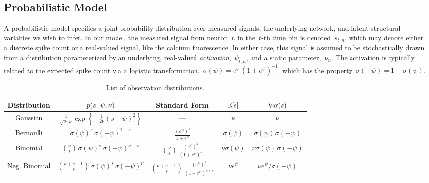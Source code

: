 \subsection{Probabilistic Model}
A probabilistic model specifies a joint probability distribution over
measured signals, the underlying network, and latent structural
variables we wish to infer.  In our model, the measured signal from
neuron~$n$ in the~$t$-th time bin is denoted~$s_{t,n}$, which may 
denote either a discrete spike count or a real-valued signal, like 
the calcium fluorescence. In either case, this signal is assumed 
to be stochastically drawn from a distribution parameterized by 
an underlying, real-valued \emph{activation},~$\psi_{t,n}$,
and a static parameter,~$\nu_n$. The
activation is typically related to the expected spike count via
a logistic transformation,~$\sigma(\psi) = e^\psi \, (1+e^\psi)^{-1}$,
which has the property~$\sigma(-\psi) = 1-\sigma(\psi)$.

\begin{table}
\begin{center}
\begin{tabular}{c|c|c|c|c}
  \textbf{Distribution} & $p(s \,|\, \psi, \nu)$ & Standard Form & $\mathbb{E}[s]$ & $\mathrm{Var}(s)$ \\
  \hline
  Gaussian & $\frac{1}{\sqrt{2 \pi \nu}}\exp \left \{ -\frac{1}{2 \nu} (s - \psi)^2 \right \}$
  & --- 
  & $\psi$ & $\nu$ \\
  Bernoulli & $\sigma(\psi)^s \, \sigma(-\psi)^{1-s}$
  & $\frac{(e^\psi)^s}{1+e^\psi}$
  & $\sigma(\psi)$ & $\sigma(\psi) \, \sigma(-\psi)$ \\
  Binomial & ${\nu \choose s} \, \sigma(\psi)^s \, \sigma(-\psi)^{\nu-s}$
  & ${\nu \choose s} \,\frac{(e^\psi)^s}{(1+e^\psi)^\nu}$
  & $\nu \sigma(\psi)$ & $\nu \sigma(\psi) \, \sigma(-\psi)$ \\
  Neg. Binomial & ${\nu + s -1 \choose s} \, \sigma(\psi)^s \, \sigma(-\psi)^{\nu}$
  & ${\nu +s - 1 \choose s} \,\frac{(e^\psi)^s}{(1+e^\psi)^{\nu+s}}$
  & $\nu e^\psi$ & $\nu e^\psi / \sigma(-\psi)$ \\
\end{tabular}
\end{center}
\caption{List of observation distributions.}
\label{tab:obs_models}
\end{table}


